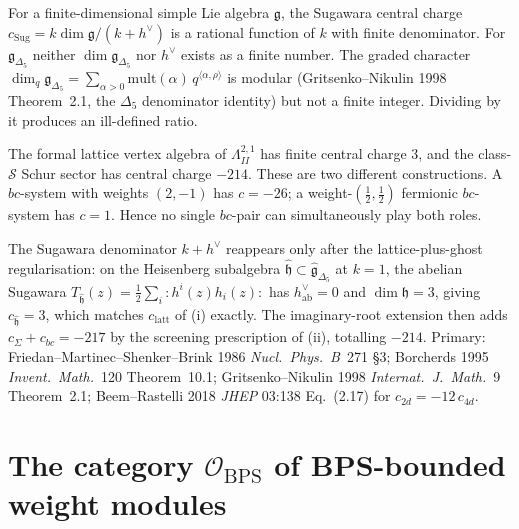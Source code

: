 \begin{remark}
\label{rem:k3ca-sugawara-denominator-failure-lattice-ghost}
For a finite-dimensional simple Lie algebra $\mathfrak g$, the
Sugawara central charge $c_{\mathrm{Sug}}=k\dim\mathfrak g/(k+h^\vee)$
is a rational function of $k$ with finite denominator. For
$\mathfrak g_{\Delta_5}$ neither $\dim\mathfrak g_{\Delta_5}$ nor
$h^\vee$ exists as a finite number. The graded character
$\dim_q\mathfrak g_{\Delta_5}=\sum_{\alpha>0}\mathrm{mult}(\alpha)\,q^{\langle\alpha,\rho\rangle}$
is modular (Gritsenko--Nikulin 1998 Theorem~2.1, the $\Delta_5$
denominator identity) but not a finite integer. Dividing by it
produces an ill-defined ratio.

The formal lattice vertex algebra of \(\Lambda^{2,1}_{II}\) has finite central charge
\(3\), and the class-\(\mathcal S\) Schur sector has central charge
\(-214\). These are two different constructions. A \(bc\)-system with
weights \((2,-1)\) has \(c=-26\); a weight-\((\tfrac12,\tfrac12)\)
fermionic \(bc\)-system has \(c=1\). Hence no single \(bc\)-pair can
simultaneously play both roles.

The Sugawara denominator $k+h^\vee$ reappears only after the
lattice-plus-ghost regularisation: on the Heisenberg subalgebra
$\widehat{\mathfrak h}\subset\widehat{\mathfrak g}_{\Delta_5}$ at
$k=1$, the abelian Sugawara
$T_{\widehat{\mathfrak h}}(z)=\tfrac12\sum_i{:}h^i(z)h_i(z){:}$
has $h^\vee_{\mathrm{ab}}=0$ and $\dim\mathfrak h=3$, giving
$c_{\widehat{\mathfrak h}}=3$, which matches $c_{\mathrm{latt}}$ of
(i) exactly. The imaginary-root extension then adds $c_{\Sigma}+c_{bc}=-217$
by the screening prescription of (ii), totalling $-214$.
Primary: Friedan--Martinec--Shenker--Brink 1986
\emph{Nucl.\ Phys.\ B}~271 \S3;
Borcherds 1995 \emph{Invent.\ Math.}~120 Theorem~10.1;
Gritsenko--Nikulin 1998 \emph{Internat.\ J.\ Math.}~9 Theorem~2.1;
Beem--Rastelli 2018 \emph{JHEP} 03:138 Eq.~(2.17) for
$c_{2d}=-12\,c_{4d}$.
\end{remark}

\section{The category \texorpdfstring{$\mathcal{O}_{\mathrm{BPS}}$}{O-BPS} of BPS-bounded weight modules}
\label{sec:k3ca-obps}

